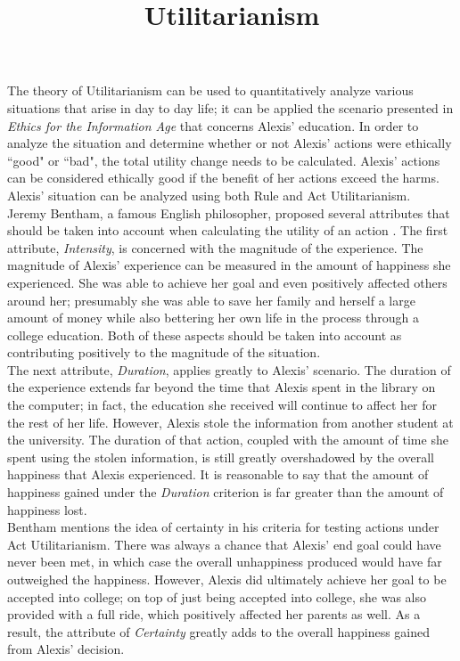 \documentclass{paper}
\title{Utilitarianism}
\date{}
\author{}
\begin{document}
\drafth{}
\inlinetitle

The theory of Utilitarianism can be used to quantitatively analyze various situations that arise in day to day life; it can be applied the scenario presented in \textit{Ethics for the Information Age} that concerns Alexis' education. In order to analyze the situation and determine whether or not Alexis' actions were ethically ``good" or ``bad", the total utility change needs to be calculated. Alexis' actions can be considered ethically good if the benefit of her actions exceed the harms. Alexis' situation can be analyzed using both Rule and Act Utilitarianism.\\

Jeremy Bentham, a famous English philosopher, proposed several attributes that should be taken into account when calculating the utility of an action \cite[75]{ethics}. The first attribute, \textit{Intensity}, is concerned with the magnitude of the experience. The magnitude of Alexis' experience can be measured in the amount of happiness she experienced. She was able to achieve her goal and even positively affected others around her; presumably she was able to save her family and herself a large amount of money while also bettering her own life in the process through a college education. Both of these aspects should be taken into account as contributing positively to the magnitude of the situation.\\

The next attribute, \textit{Duration}, applies greatly to Alexis' scenario. The duration of the experience extends far beyond the time that Alexis spent in the library on the computer; in fact, the education she received will continue to affect her for the rest of her life. However, Alexis stole the information from another student at the university. The duration of that action, coupled with the amount of time she spent using the stolen information, is still greatly overshadowed by the overall happiness that Alexis experienced. It is reasonable to say that the amount of happiness gained under the \textit{Duration} criterion is far greater than the amount of happiness lost.\\

Bentham mentions the idea of certainty in his criteria for testing actions under Act Utilitarianism. There was always a chance that Alexis' end goal could have never been met, in which case the overall unhappiness produced would have far outweighed the happiness. However, Alexis did ultimately achieve her goal to be accepted into college; on top of just being accepted into college, she was also provided with a full ride, which positively affected her parents as well. As a result, the attribute of \textit{Certainty} greatly adds to the overall happiness gained from Alexis' decision. \\
\end{document}
